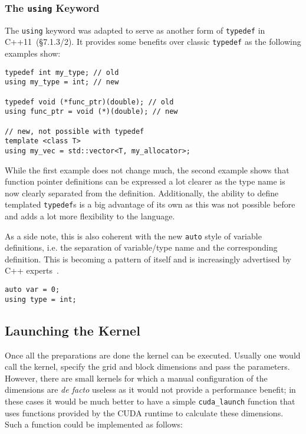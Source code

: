 \subsubsection{The \texttt{using} Keyword}\label{vec_add:using}

The \texttt{using} keyword was adapted to serve as another form of \texttt{typedef} in C++11~\cite{cpp11std}(§7.1.3/2). It provides some benefits over classic \texttt{typedef} as the following examples show:

\begin{lstlisting}
typedef int my_type; // old
using my_type = int; // new

typedef void (*func_ptr)(double); // old
using func_ptr = void (*)(double); // new

// new, not possible with typedef
template <class T>
using my_vec = std::vector<T, my_allocator>;
\end{lstlisting}

While the first example does not change much, the second example shows that function pointer definitions can be expressed a lot clearer as the type name is now clearly separated from the definition. Additionally, the ability to define templated \texttt{typedef}s is a big advantage of its own as this was not possible before and adds a lot more flexibility to the language.

As a side note, this is also coherent with the new \texttt{auto} style of variable definitions, i.e. the separation of variable/type name and the corresponding definition. This is becoming a pattern of itself and is increasingly advertised by C++ experts~\cite{sutter_cppcon}.

\begin{lstlisting}
auto var = 0;
using type = int;
\end{lstlisting}

\subsection{Launching the Kernel}

Once all the preparations are done the kernel can be executed. Usually one would call the kernel, specify the grid and block dimensions and pass the parameters. However, there are small kernels for which a manual configuration of the dimensions are \textit{de facto} useless as it would not provide a performance benefit; in these cases it would be much better to have a simple \texttt{cuda\_launch} function that uses functions provided by the CUDA runtime to calculate these dimensions. Such a function could be implemented as follows:

